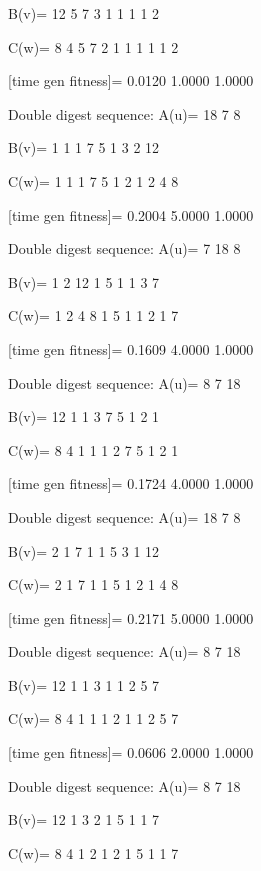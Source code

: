 B(v)=
    12     5     7     3     1     1     1     1     2

C(w)=
     8     4     5     7     2     1     1     1     1     1     2

[time gen fitness]=
    0.0120    1.0000    1.0000

Double digest sequence:
A(u)=
    18     7     8

B(v)=
     1     1     1     7     5     1     3     2    12

C(w)=
     1     1     1     7     5     1     2     1     2     4     8

[time gen fitness]=
    0.2004    5.0000    1.0000

Double digest sequence:
A(u)=
     7    18     8

B(v)=
     1     2    12     1     5     1     1     3     7

C(w)=
     1     2     4     8     1     5     1     1     2     1     7

[time gen fitness]=
    0.1609    4.0000    1.0000

Double digest sequence:
A(u)=
     8     7    18

B(v)=
    12     1     1     3     7     5     1     2     1

C(w)=
     8     4     1     1     1     2     7     5     1     2     1

[time gen fitness]=
    0.1724    4.0000    1.0000

Double digest sequence:
A(u)=
    18     7     8

B(v)=
     2     1     7     1     1     5     3     1    12

C(w)=
     2     1     7     1     1     5     1     2     1     4     8

[time gen fitness]=
    0.2171    5.0000    1.0000

Double digest sequence:
A(u)=
     8     7    18

B(v)=
    12     1     1     3     1     1     2     5     7

C(w)=
     8     4     1     1     1     2     1     1     2     5     7

[time gen fitness]=
    0.0606    2.0000    1.0000

Double digest sequence:
A(u)=
     8     7    18

B(v)=
    12     1     3     2     1     5     1     1     7

C(w)=
     8     4     1     2     1     2     1     5     1     1     7

